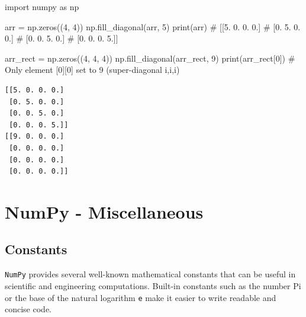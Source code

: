 \documentclass[
  english,
  letterpaper,
  DIV=11,
  numbers=noendperiod]{scrreprt}
\newenvironment{Shaded}{\begin{snugshade}}{\end{snugshade}}
\newcommand{\BuiltInTok}[1]{\textcolor[rgb]{0.00,0.23,0.31}{#1}}
\newcommand{\CommentTok}[1]{\textcolor[rgb]{0.37,0.37,0.37}{#1}}
\newcommand{\DecValTok}[1]{\textcolor[rgb]{0.68,0.00,0.00}{#1}}
\newcommand{\ImportTok}[1]{\textcolor[rgb]{0.00,0.46,0.62}{#1}}
\newcommand{\NormalTok}[1]{\textcolor[rgb]{0.00,0.23,0.31}{#1}}
\newcommand{\OperatorTok}[1]{\textcolor[rgb]{0.37,0.37,0.37}{#1}}
\begin{document}
\begin{Shaded}
\begin{Highlighting}[]
\ImportTok{import}\NormalTok{ numpy }\ImportTok{as}\NormalTok{ np}

\NormalTok{arr }\OperatorTok{=}\NormalTok{ np.zeros((}\DecValTok{4}\NormalTok{, }\DecValTok{4}\NormalTok{))}
\NormalTok{np.fill\_diagonal(arr, }\DecValTok{5}\NormalTok{)}
\BuiltInTok{print}\NormalTok{(arr)}
\CommentTok{\# [[5. 0. 0. 0.]}
\CommentTok{\#  [0. 5. 0. 0.]}
\CommentTok{\#  [0. 0. 5. 0.]}
\CommentTok{\#  [0. 0. 0. 5.]]}

\NormalTok{arr\_rect }\OperatorTok{=}\NormalTok{ np.zeros((}\DecValTok{4}\NormalTok{, }\DecValTok{4}\NormalTok{, }\DecValTok{4}\NormalTok{))}
\NormalTok{np.fill\_diagonal(arr\_rect, }\DecValTok{9}\NormalTok{)}
\BuiltInTok{print}\NormalTok{(arr\_rect[}\DecValTok{0}\NormalTok{])  }\CommentTok{\# Only element [0][0] set to 9 (super{-}diagonal i,i,i)}
\end{Highlighting}
\end{Shaded}

\begin{verbatim}
[[5. 0. 0. 0.]
 [0. 5. 0. 0.]
 [0. 0. 5. 0.]
 [0. 0. 0. 5.]]
[[9. 0. 0. 0.]
 [0. 0. 0. 0.]
 [0. 0. 0. 0.]
 [0. 0. 0. 0.]]
\end{verbatim}

\chapter{NumPy - Miscellaneous}\label{numpy---miscellaneous}

\section{Constants}\label{constants}

\texttt{NumPy} provides several well-known mathematical constants that
can be useful in scientific and engineering computations. Built-in
constants such as the number Pi or the base of the natural logarithm
\texttt{e} make it easier to write readable and concise code.
\end{document}

